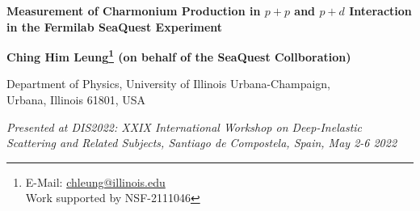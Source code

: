 \documentclass[10pt,a4paper,final]{article}
\begin{document}
\begin{center}
	{\LARGE \bf Measurement of Charmonium Production in $p + p$ and $p + d$ Interaction in the Fermilab SeaQuest Experiment}

	\par\vspace*{2.5mm}\par

	{

		\bigskip

		\large \bf Ching Him Leung\footnote{E-Mail: \href{mailto:chleung@illinois.edu}{chleung@illinois.edu}\\Work supported by NSF-2111046} (on behalf of the SeaQuest Collboration)}

	\vspace*{2.5mm}

	{Department of Physics, University of Illinois Urbana-Champaign, \\Urbana, Illinois 61801, USA}

	\vspace*{2.5mm}

	{\it Presented at DIS2022: XXIX International Workshop on Deep-Inelastic Scattering and Related Subjects, Santiago de Compostela, Spain, May 2-6 2022}


	\vspace*{2.5mm}


\end{center}
\begin{abstract}
	The Fermilab SeaQuest experiment has measured dimuon events from the interaction
	of \SI{120}{\GeV} proton beam on liquid hydrogen and deuterium targets with dimuon
	mass between \num{2} and \SI{9}{\GeV}. These dimuon events contain both the Drell-Yan
	process and the charmonium ($J/\psi$ and $\psi^\prime$) production. Unlike the Drell-Yan process
	which probes the antiquark distributions in the nucleons, the charmonium production
	is sensitive to both quark and gluon distributions. SeaQuest has extracted the
	$\sigma^{pd}/2\sigma^{pp}$ ratios as well as the differential cross sections for
	charmonium production in the kinematic region of $0.4 < x_F < 0.9$. The $\sigma^{pd}/2\sigma^{pp}$
	ratios for charmonium production are found to be significantly different
	from that of the Drell-Yan process. The measured differential cross sections for
	charmonium production are compared with theoretical calculations using Color Evaporation Model
	and Non-Relativistic QCD model.
\end{abstract}
\end{document}
